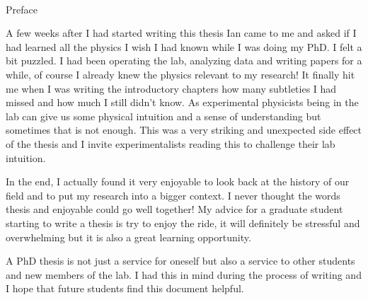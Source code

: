 
\renewcommand{\baselinestretch}{2}
\small\normalsize
\hbox{\ }
 
\vspace{-.65in}

\begin{center}
\large{Preface} 
\end{center} 

A few weeks after I had started writing this thesis Ian came to me and asked if I had learned all the physics I wish I had known while I was doing my PhD. I felt a bit puzzled. I had been operating the lab, analyzing data and writing papers for a while, of course I already knew the physics relevant to my research! It finally hit me when I was writing the introductory chapters how many subtleties I had missed and how much I still didn't know. As experimental physicists being in the lab can give us some physical intuition and a sense of understanding but sometimes that is not enough. This was a very striking and unexpected side effect of the thesis and I invite experimentalists reading this to challenge their lab intuition. 

In the end, I actually found it very enjoyable to look back at the history of our field and to put my research into a bigger context. I never thought the words thesis and  enjoyable could go well together! My advice for a graduate student starting to write a thesis is try to enjoy the ride, it will definitely be stressful and overwhelming but it is also a great learning opportunity. 

A PhD thesis is not just a service for oneself but also a service to other students and new members of the lab. I had this in mind during the process of writing and I hope that future students find this document helpful. 
